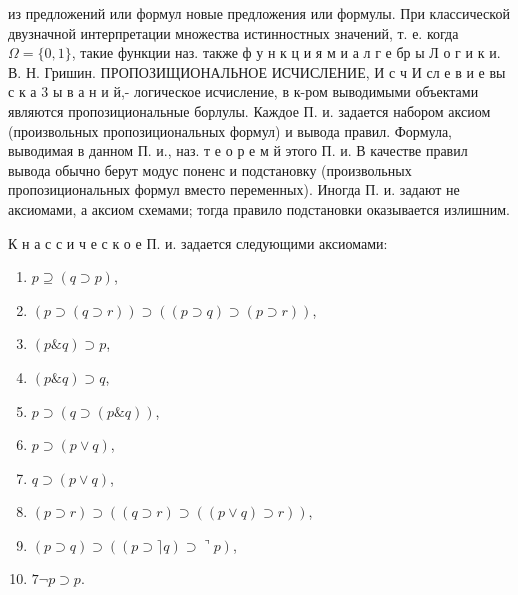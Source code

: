 \documentclass[10pt]{article}
\begin{document}
из предложений или формул новые предложения или формулы. При классической двузначной интерпретации множества истинностных значений, т. е. когда $\Omega=\{0,1\}$, такие функции наз. также ф у н к ц и я м и а л г е бр ы Л о г и к и. В. Н. Гришин. ПРОПОЗИЩИОНАЛЬНОЕ ИСЧИСЛЕНИЕ, И с ч И сл е в и е вы с к а 3 ы в а н и й,- логическое исчисление, в к-ром выводимыми объектами являются пропозициональные борлулы. Каждое П. и. задается набором аксиом (произвольных пропозициональных формул) и вывода правил. Формула, выводимая в данном П. и., наз. т е о р е м й этого П. и. В качестве правил вывода обычно берут модус поненс и подстановку (произвольных пропозициональных формул вместо переменных). Иногда П. и. задают не аксиомами, а аксиом схемами; тогда правило подстановки оказывается излишним.



К н а с с и ч е с к о е П. и. задается следующими аксиомами:



\begin{enumerate}

  \item $p \supseteq(q \supset p)$,



  \item $(p \supset(q \supset r)) \supset((p \supset q) \supset(p \supset r))$,



  \item $(p \& q) \supset p$,



  \item $(p \& q) \supset q$,



  \item $p \supset(q \supset(p \& q))$,



  \item $p \supset(p \vee q)$,



  \item $q \supset(p \vee q)$,



  \item $(p \supset r) \supset((q \supset r) \supset((p \vee q) \supset r))$,



  \item $(p \supset q) \supset((p \supset\rceil q) \supset\urcorner p)$,



  \item $7 \neg p \supset p$.



\end{enumerate}
\end{document}
